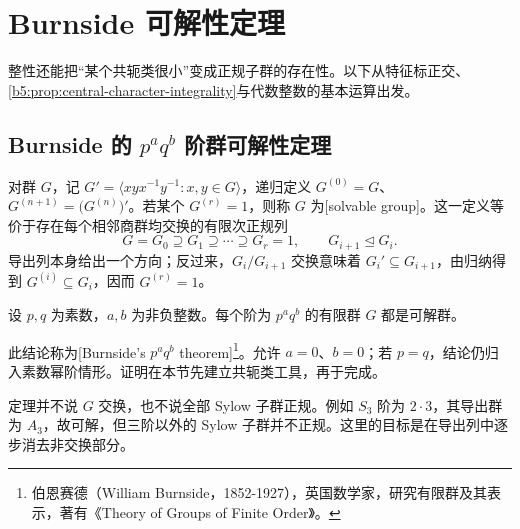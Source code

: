 
\section{Burnside 可解性定理}
\label{b5:sec:0505}

整性还能把“某个共轭类很小”变成正规子群的存在性。以下从特征标正交、\cref{b5:prop:central-character-integrality}与代数整数的基本运算出发。

\subsection{\texorpdfstring{Burnside 的 \(p^aq^b\) 阶群可解性定理}{Burnside 的 paqb 阶群可解性定理}}
\label{b5:subsec:0505:01}

对群 \(G\)，记 \(G'=\langle xyx^{-1}y^{-1}:x,y\in G\rangle\)，递归定义 \(G^{(0)}=G\)、\(G^{(n+1)}=\bigl(G^{(n)}\bigr)'\)。若某个 \(G^{(r)}=1\)，则称 \(G\) 为[solvable group]。这一定义等价于存在每个相邻商群均交换的有限次正规列
\[
	G=G_0\supseteq G_1\supseteq\cdots\supseteq G_r=1, \qquad G_{i+1}\trianglelefteq G_i.
\]
导出列本身给出一个方向；反过来，\(G_i/G_{i+1}\) 交换意味着 \(G_i'\subseteq G_{i+1}\)，由归纳得到 \(G^{(i)}\subseteq G_i\)，因而 \(G^{(r)}=1\)。

\begin{theorem}\label{b5:thm:burnside-solvability}
	设 \(p,q\) 为素数，\(a,b\) 为非负整数。每个阶为 \(p^a q^b\) 的有限群 \(G\) 都是可解群。
\end{theorem}
此结论称为[Burnside's \(p^a q^b\) theorem]\footnote{伯恩赛德（William Burnside，1852-1927），英国数学家，研究有限群及其表示，著有《Theory of Groups of Finite Order》。}。允许 \(a=0\)、\(b=0\)；若 \(p=q\)，结论仍归入素数幂阶情形。证明在本节先建立共轭类工具，再于完成。

\ProseParagraphBreak
定理并不说 \(G\) 交换，也不说全部 Sylow 子群正规。例如 \(S_3\) 阶为 \(2\cdot3\)，其导出群为 \(A_3\)，故可解，但三阶以外的 Sylow 子群并不正规。这里的目标是在导出列中逐步消去非交换部分。


